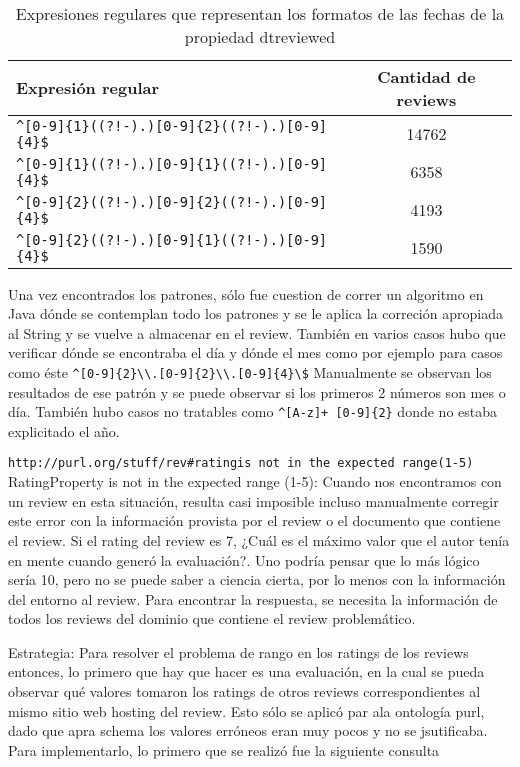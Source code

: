 \\
\begin{table}[h]
\begin{tabular}{| l | c |}\hline
Expresión regular & Cantidad de reviews\\\hline
\verb|^[0-9]{1}((?!-).)[0-9]{2}((?!-).)[0-9]{4}$| & 14762\\
\verb|^[0-9]{1}((?!-).)[0-9]{1}((?!-).)[0-9]{4}$| & 6358\\
\verb|^[0-9]{2}((?!-).)[0-9]{2}((?!-).)[0-9]{4}$| & 4193\\
\verb|^[0-9]{2}((?!-).)[0-9]{1}((?!-).)[0-9]{4}$| & 1590\\\hline
\end{tabular}
\caption{Expresiones regulares que representan los formatos de las fechas de la propiedad  dtreviewed}
\label{table:RegExpressionsDtreviewed}
\end{table}

Una vez encontrados los patrones, sólo fue cuestion de correr un algoritmo en Java dónde se contemplan todo los patrones y se 
le aplica la correción apropiada al String y se vuelve a almacenar en el review.
También en varios casos hubo que verificar dónde se encontraba el día y dónde el mes como por ejemplo para casos como éste 
\verb|^[0-9]{2}\\.[0-9]{2}\\.[0-9]{4}\$|
Manualmente se observan los resultados de ese patrón y se puede observar si los primeros 2 números son mes o día.
También hubo casos no tratables como \verb|^[A-z]+ [0-9]{2}| donde no estaba explicitado el año.

\noindent\verb|http://purl.org/stuff/rev#ratingis not in the expected range(1-5)|\\


{RatingProperty} is not in the expected range (1-5):
Cuando nos encontramos con un review en esta situación, resulta casi imposible incluso manualmente corregir este error con la información 
provista por el review o el documento que contiene el review. Si el rating del review es 7, ¿Cuál es el máximo valor que el autor tenía en mente cuando  
generó la evaluación?. Uno podría pensar que lo más lógico sería 10, pero no se puede saber a ciencia cierta, por lo menos con la información del entorno al review.
Para encontrar la respuesta, se necesita la información de todos los reviews del dominio que contiene el review problemático. 

Estrategia:
Para resolver el problema de rango en los ratings de los reviews entonces, lo primero que hay que hacer es una evaluación, en la cual 
se pueda observar qué valores tomaron los ratings de otros reviews correspondientes al mismo sitio web hosting del review. 
Esto sólo se aplicó par ala ontología purl, dado que apra schema los valores erróneos eran muy pocos y no se jsutificaba.
Para implementarlo, lo primero que se realizó fue la siguiente consulta

